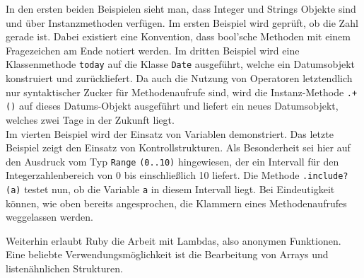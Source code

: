 In den ersten beiden Beispielen sieht man, dass Integer und Strings Objekte sind und über Instanzmethoden verfügen. Im ersten Beispiel wird geprüft, ob die Zahl gerade ist. Dabei existiert eine Konvention, dass bool'sche Methoden mit einem Fragezeichen am Ende notiert werden. Im dritten Beispiel wird eine Klassenmethode \texttt{today} auf die Klasse \texttt{Date} ausgeführt, welche ein Datumsobjekt konstruiert und zurückliefert. Da auch die Nutzung von Operatoren letztendlich nur syntaktischer Zucker für Methodenaufrufe sind, wird die Instanz-Methode \texttt{.+()} auf dieses Datums-Objekt ausgeführt und liefert ein neues Datumsobjekt, welches zwei Tage in der Zukunft liegt.\\
Im vierten Beispiel wird der Einsatz von Variablen demonstriert.
Das letzte Beispiel zeigt den Einsatz von Kontrollstrukturen. Als Besonderheit sei hier auf den Ausdruck vom Typ \texttt{Range} \texttt{(0..10)} hingewiesen, der ein Intervall für den Integerzahlenbereich von 0 bis einschließlich 10 liefert. Die Methode \texttt{.include?(a)} testet nun, ob die Variable \texttt{a} in diesem Intervall liegt. Bei Eindeutigkeit können, wie oben bereits angesprochen, die Klammern eines Methodenaufrufes weggelassen werden.

Weiterhin erlaubt Ruby die Arbeit mit Lambdas, also anonymen Funktionen. Eine beliebte Verwendungsmöglichkeit ist die Bearbeitung von Arrays und listenähnlichen Strukturen.

%
%
%
%

